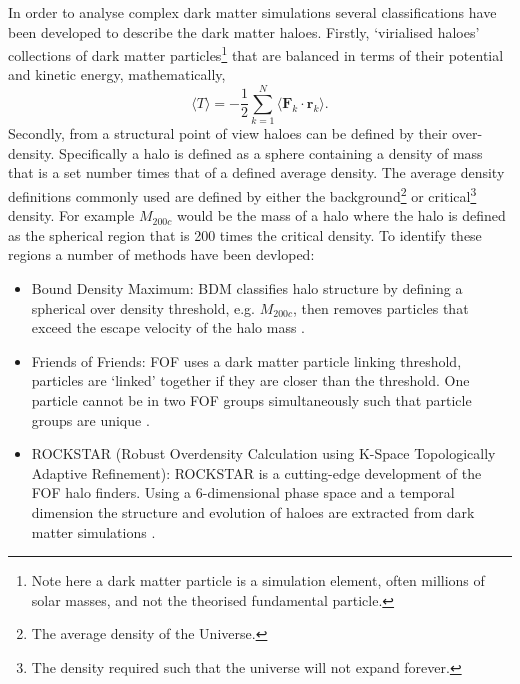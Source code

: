 In order to analyse complex dark matter simulations several classifications have been developed to describe the dark matter haloes. Firstly, `virialised haloes' collections of dark matter particles\footnote{Note here a dark matter particle is a simulation element, often millions of solar masses, and not the theorised fundamental particle.} that are balanced in terms of their potential and kinetic energy, mathematically, 
\begin{equation}
    \langle T \rangle = -\frac{1}{2}\sum^{N}_{k=1}\langle \mathbf{F}_k \cdot \mathbf{r}_k \rangle.
\end{equation}
Secondly, from a structural point of view haloes can be defined by their over-density. 
Specifically a halo is defined as a sphere containing a density of mass that is a set number times that of a defined average density. The average density definitions commonly used are defined by either the background\footnote{The average density of the Universe.} or critical\footnote{The density required such that the universe will not expand forever.} density.
For example $M_{200c}$ would be the mass of a halo where the halo is defined as the spherical region that is 200 times the critical density. To identify these regions a number of methods have been devloped:

\begin{itemize}
    \item Bound Density Maximum: BDM classifies halo structure by defining a spherical over density threshold, e.g. $M_{200c}$, then removes particles that exceed the escape velocity of the halo mass \citep{Klypin1997Particle-MeshSimulations}.
    \item Friends of Friends: FOF uses a dark matter particle linking threshold, particles are `linked' together if they are closer than the threshold. One particle cannot be in two FOF groups simultaneously such that particle groups are unique \citep{Davis1985THEMATTER}.
    \item ROCKSTAR (Robust Overdensity Calculation using K-Space Topologically Adaptive Refinement): ROCKSTAR is a cutting-edge development of the FOF halo finders. Using a 6-dimensional phase space and a temporal dimension the structure and evolution of haloes are extracted from dark matter simulations \citep{Behroozi2011TheCores}.
\end{itemize}

